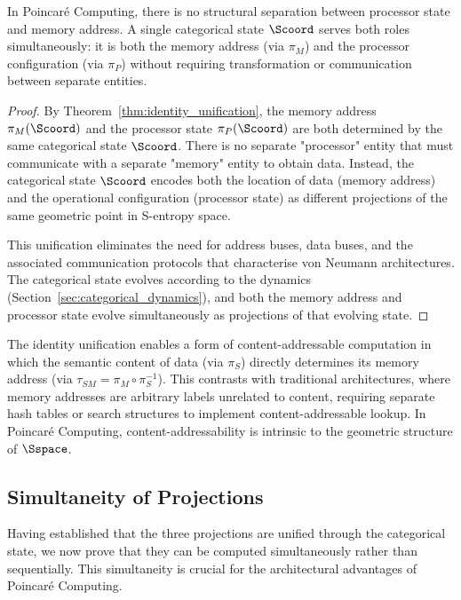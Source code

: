\begin{corollary}
\label{cor:no_pm_distinction}
In Poincaré Computing, there is no structural separation between processor state and memory address. A single categorical state $\Scoord$ serves both roles simultaneously: it is both the memory address (via $\pi_M$) and the processor configuration (via $\pi_P$) without requiring transformation or communication between separate entities.
\end{corollary}

\begin{proof}
By Theorem~\ref{thm:identity_unification}, the memory address $\pi_M(\Scoord)$ and the processor state $\pi_P(\Scoord)$ are both determined by the same categorical state $\Scoord$. There is no separate "processor" entity that must communicate with a separate "memory" entity to obtain data. Instead, the categorical state $\Scoord$ encodes both the location of data (memory address) and the operational configuration (processor state) as different projections of the same geometric point in S-entropy space.

This unification eliminates the need for address buses, data buses, and the associated communication protocols that characterise von Neumann architectures. The categorical state evolves according to the dynamics (Section~\ref{sec:categorical_dynamics}), and both the memory address and processor state evolve simultaneously as projections of that evolving state.
\end{proof}

\begin{remark}
\label{rem:content_addressable}
The identity unification enables a form of content-addressable computation in which the semantic content of data (via $\pi_S$) directly determines its memory address (via $\tau_{SM} = \pi_M \circ \pi_S^{-1}$). This contrasts with traditional architectures, where memory addresses are arbitrary labels unrelated to content, requiring separate hash tables or search structures to implement content-addressable lookup. In Poincaré Computing, content-addressability is intrinsic to the geometric structure of $\Sspace$.
\end{remark}

\subsection{Simultaneity of Projections}

Having established that the three projections are unified through the categorical state, we now prove that they can be computed simultaneously rather than sequentially. This simultaneity is crucial for the architectural advantages of Poincaré Computing.

